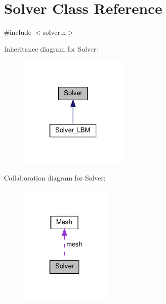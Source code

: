 \hypertarget{classSolver}{}\section{Solver Class Reference}
\label{classSolver}


{\ttfamily \#include $<$solver.\+h$>$}



Inheritance diagram for Solver\+:
\nopagebreak
\begin{figure}[H]
\begin{center}
\leavevmode
\includegraphics[width=150pt]{classSolver__inherit__graph}
\end{center}
\end{figure}


Collaboration diagram for Solver\+:
\nopagebreak
\begin{figure}[H]
\begin{center}
\leavevmode
\includegraphics[width=130pt]{classSolver__coll__graph}
\end{center}
\end{figure}
